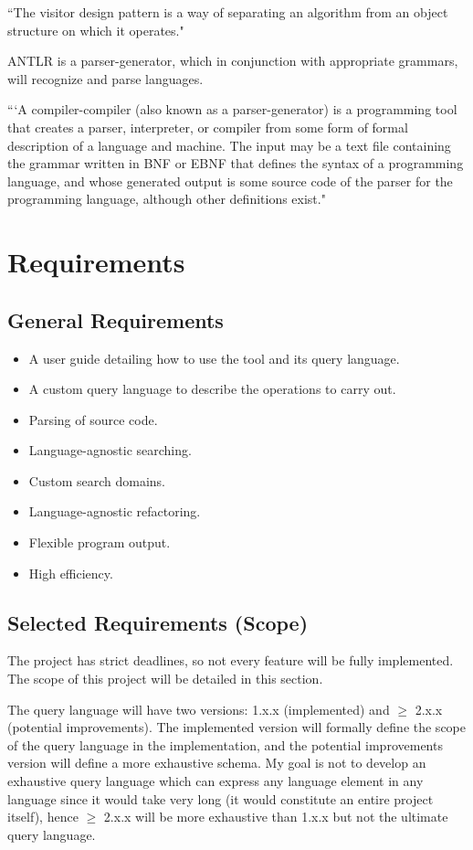 \documentclass[12pt, letterpaper]{article}
\begin{document}
``The visitor design pattern is a way of separating an algorithm from an object structure on which it operates." \autocite{wikipediavisitorpattern}

ANTLR is a parser-generator, which in conjunction with appropriate grammars, will recognize and parse languages.

```A compiler-compiler (also known as a parser-generator) is a programming tool that creates a parser, interpreter, or compiler from some form of formal description of a language and machine. The input may be a text file containing the grammar written in BNF or EBNF that defines the syntax of a programming language, and whose generated output is some source code of the parser for the programming language, although other definitions exist." \autocite{wikipediacompilercompiler}

\section{Requirements}
\subsection{General Requirements}
\begin{itemize}
    \item A user guide detailing how to use the tool and its query language.
    \item A custom query language to describe the operations to carry out.
    \item Parsing of source code.
    \item Language-agnostic searching.
    \item Custom search domains.
    \item Language-agnostic refactoring.
    \item Flexible program output.
    \item High efficiency.
\end{itemize}

\subsection{Selected Requirements (Scope)}
The project has strict deadlines, so not every feature will be fully implemented.
The scope of this project will be detailed in this section.

The query language will have two versions: 1.x.x (implemented) and $ \geq $ 2.x.x (potential improvements).
The implemented version will formally define the scope of the query language in the implementation, and the potential improvements version will define a more exhaustive schema.
My goal is not to develop an exhaustive query language which can express any language element in any language since it would take very long (it would constitute an entire project itself), hence $ \geq $ 2.x.x will be more exhaustive than 1.x.x but not the ultimate query language.
\end{document}
